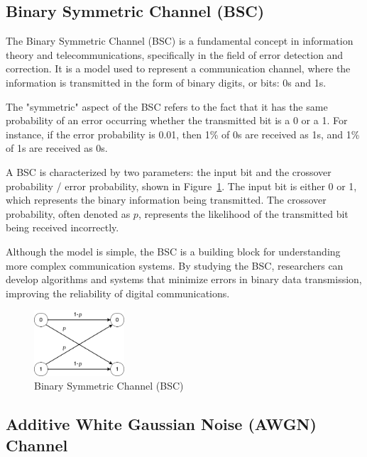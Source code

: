 \documentclass{article}
\begin{document}
\subsection{Binary Symmetric Channel (BSC)}
The Binary Symmetric Channel (BSC) is a fundamental concept in information theory and telecommunications, specifically in the field of error detection and correction. It is a model used to represent a communication channel, where the information is transmitted in the form of binary digits, or bits: 0s and 1s.

The "symmetric" aspect of the BSC refers to the fact that it has the same probability of an error occurring whether the transmitted bit is a 0 or a 1. For instance, if the error probability is 0.01, then 1\% of 0s are received as 1s, and 1\% of 1s are received as 0s. 

A BSC is characterized by two parameters: the input bit and the crossover probability / error probability, shown in Figure~\ref{fig:bsc}. The input bit is either 0 or 1, which represents the binary information being transmitted. The crossover probability, often denoted as $p$, represents the likelihood of the transmitted bit being received incorrectly. 

Although the model is simple, the BSC is a building block for understanding more complex communication systems. By studying the BSC, researchers can develop algorithms and systems that minimize errors in binary data transmission, improving the reliability of digital communications.

\begin{figure}[htb]
    \centering
    \includegraphics[width=0.3\textwidth]{bsc.png}
    \caption{Binary Symmetric Channel (BSC)}
    \label{fig:bsc}
\end{figure}








\subsection{Additive White Gaussian Noise (AWGN) Channel}
\end{document}

